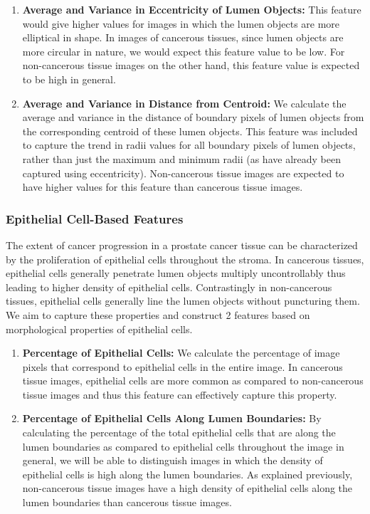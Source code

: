 \begin{enumerate}
\item \textbf{Average and Variance in Eccentricity of Lumen Objects:} This feature would give higher values for images in which the lumen objects are more elliptical in shape. In images of cancerous tissues, since lumen objects are more circular in nature, we would expect this feature value to be low. For non-cancerous tissue images on the other hand, this feature value is expected to be high in general.

\item \textbf{Average and Variance in Distance from Centroid:} We calculate the average and variance in the distance of boundary pixels of lumen objects from the corresponding centroid of these lumen objects. This feature was included to capture the trend in radii values for all boundary pixels of lumen objects, rather than just the maximum and minimum radii (as have already been captured using eccentricity). Non-cancerous tissue images are expected to have higher values for this feature than cancerous tissue images.

\end{enumerate}

\subsubsection{Epithelial Cell-Based Features}
The extent of cancer progression in a prostate cancer tissue can be characterized by the proliferation of epithelial cells throughout the stroma. In cancerous tissues, epithelial cells generally penetrate lumen objects multiply uncontrollably thus leading to higher density of epithelial cells. Contrastingly in non-cancerous tissues, epithelial cells generally line the lumen objects without puncturing them. We aim to capture these properties and construct 2 features based on morphological properties of epithelial cells.

\begin{enumerate}
\item \textbf{Percentage of Epithelial Cells:} We calculate the percentage of image pixels that correspond to epithelial cells in the entire image. In cancerous tissue images, epithelial cells are more common as compared to non-cancerous tissue images and thus this feature can effectively capture this property.

\item \textbf{Percentage of Epithelial Cells Along Lumen Boundaries:} By calculating the percentage of the total epithelial cells that are along the lumen boundaries as compared to epithelial cells throughout the image in general, we will be able to distinguish images in which the density of epithelial cells is high along the lumen boundaries. As explained previously, non-cancerous tissue images have a high density of epithelial cells along the lumen boundaries than cancerous tissue images. 

\end{enumerate}

